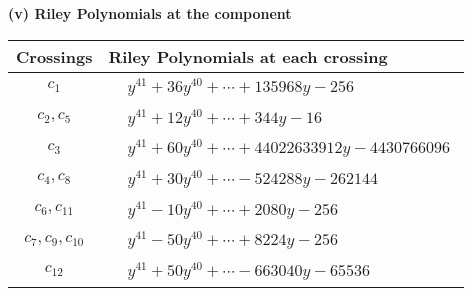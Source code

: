 \documentclass[1p]{elsarticle_modified}
\theoremstyle{definition}
\begin{document}
\flushleft \textbf{(v) Riley Polynomials at the component}\newline \\
\begin{tabular}{m{50pt}|m{274pt}}
Crossings & \hspace{64pt}Riley Polynomials at each crossing \\
\hline $$\begin{aligned}c_{1}\end{aligned}$$&$\begin{aligned}
&y^{41}+36 y^{40}+\cdots+135968 y-256
\end{aligned}$\\
\hline $$\begin{aligned}c_{2},c_{5}\end{aligned}$$&$\begin{aligned}
&y^{41}+12 y^{40}+\cdots+344 y-16
\end{aligned}$\\
\hline $$\begin{aligned}c_{3}\end{aligned}$$&$\begin{aligned}
&y^{41}+60 y^{40}+\cdots+44022633912 y-4430766096
\end{aligned}$\\
\hline $$\begin{aligned}c_{4},c_{8}\end{aligned}$$&$\begin{aligned}
&y^{41}+30 y^{40}+\cdots-524288 y-262144
\end{aligned}$\\
\hline $$\begin{aligned}c_{6},c_{11}\end{aligned}$$&$\begin{aligned}
&y^{41}-10 y^{40}+\cdots+2080 y-256
\end{aligned}$\\
\hline $$\begin{aligned}c_{7},c_{9},c_{10}\end{aligned}$$&$\begin{aligned}
&y^{41}-50 y^{40}+\cdots+8224 y-256
\end{aligned}$\\
\hline $$\begin{aligned}c_{12}\end{aligned}$$&$\begin{aligned}
&y^{41}+50 y^{40}+\cdots-663040 y-65536
\end{aligned}$\\
\hline
\end{tabular}\\~\\
\end{document}
